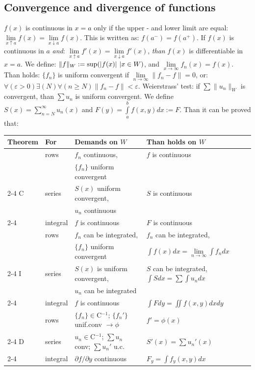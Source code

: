 \documentclass[twoside]{report}
\begin{document}
\subsection{Convergence and divergence of functions}
\label{sec:convf}
$f(x)$ is continuous in $x=a$ only if the upper - and lower limit are equal:
$\lim\limits_{x\uparrow a}f(x)=\lim\limits_{x\downarrow a}f(x)$.
This is written as: $f(a^-)=f(a^+)$.
\npar
If $f(x)$ is continuous in $a$ {\it and}:
$\lim\limits_{x\uparrow a}f'(x)=\lim\limits_{x\downarrow a}f'(x)$,
{\it than} $f(x)$ is differentiable in $x=a$.
\npar
We define: $\|f\|_W:={\rm sup}(|f(x)|~|x\in W)$, and $\lim\limits_{x\rightarrow\infty}f_n(x)=f(x)$.
Than holds: $\{f_n\}$ is uniform convergent if $\lim\limits_{n\rightarrow\infty}\|f_n-f\|=0$,
or: $\forall(\varepsilon>0)\exists(N)\forall(n\geq N)\|f_n-f\|<\varepsilon$.
\npar
Weierstrass' test: if $\sum\|u_n\|_W$ is convergent, than $\sum u_n$ is
uniform convergent.
\npar
We define $\displaystyle S(x)=\sum_{n=N}^\infty u_n(x)$ and
$\displaystyle F(y)=\int\limits_a^bf(x,y)dx:=F$. Than it can be proved that:
\begin{center}
\begin{tabular}{||l|l|p{5cm}|p{6cm}||}
\hline
\bf Theorem&\bf For&\bf Demands on $W$&\bf Than holds on $W$\\
\hline
\hline
 &rows    &$f_n$ continuous,                           &$f$ is continuous\\
 &        &$\{f_n\}$ uniform convergent                &\\
\cline{2-4}
C&series  &$S(x)$ uniform convergent,                  &$S$ is continuous\\
 &        &$u_n$ continuous                            &\\
\cline{2-4}
 &integral&$f$ is continuous                           &$F$ is continuous\\
\hline
 &rows    &$f_n$ can be integrated,                    &$f_n$ can be integrated,\\
 &        &$\{f_n\}$ uniform convergent                &$\int f(x)dx=\lim\limits_{n\rightarrow\infty}\int f_ndx$\rule[-10pt]{0pt}{0pt}\\
\cline{2-4}
I&series  &$S(x)$ is uniform convergent,               &$S$ can be integrated, $\int Sdx=\sum\int u_ndx$\rule{0pt}{13pt}\\
 &        &$u_n$ can be integrated                     &\\
\cline{2-4}
 &integral&$f$ is continuous                           &$\int Fdy=\iint f(x,y)dxdy$\rule{0pt}{13pt}\rule[-8pt]{0pt}{0pt}\\
\hline
 &rows    &$\{f_n\}\in$C$^{-1}$; $\{f_n'\}$ unif.conv $\rightarrow\phi$&$f'=\phi(x)$\rule{0pt}{13pt}\rule[-7pt]{0pt}{0pt}\\
\cline{2-4}
D&series  &$u_n\in$C$^{-1}$; $\sum u_n$ conv; $\sum u_n'$ u.c.&$S'(x)=\sum u_n'(x)$\rule{0pt}{13pt}\rule[-7pt]{0pt}{0pt}\\
\cline{2-4}
 &integral&$\partial f/\partial y$ continuous          &$F_y=\int f_y(x,y)dx$\rule{0pt}{13pt}\rule[-7pt]{0pt}{0pt}\\
\hline
\end{tabular}
\end{center}
\end{document}
